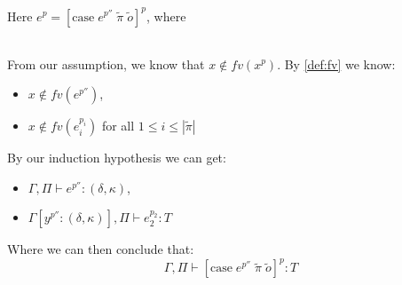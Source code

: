 \item[\runa{T-Case}] Here $e^p=[\mbox{case}\;e^{p''}\;\tilde{\pi}\;\tilde{o}]^p$, where
\begin{figure}[H]
	\setlength\tabcolsep{8pt}
	\begin{tabular}{l}
		
	\end{tabular}
\end{figure}
From our assumption, we know that $x\notin fv(x^p)$.
By \cref{def:fv} we know:
\begin{itemize}
	\item $x\notin fv(e^{p''})$,
	\item $x\notin fv(e_i^{p_i})$ for all $1\leq i\leq|\tilde{\pi}|$
\end{itemize}
By our induction hypothesis we can get:
\begin{itemize}
	\item $\Gamma,\Pi\vdash e^{p''}:(\delta,\kappa)$,
	\item $\Gamma[y^{p''}:(\delta,\kappa)],\Pi\vdash e_2^{p_2}:T$
\end{itemize}
Where we can then conclude that:
$$\Gamma,\Pi\vdash [\mbox{case}\;e^{p''}\;\tilde{\pi}\;\tilde{o}]^{p}:T$$
